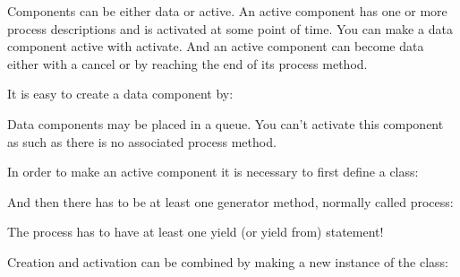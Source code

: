 \documentclass[letterpaper,10pt,english]{sphinxmanual}
\begin{document}
Components can be either data or active. An active component has one or more process descriptions and is activated
at some point of time. You can make a data component active with activate. And an active component can become
data either with a cancel or by reaching the end of its process method.

It is easy to create a data component by:

%
\begin{sphinxVerbatim}[commandchars=\\\{\}]
  
\end{sphinxVerbatim}

Data components may be placed in a queue. You can’t activate this component as such as there is no associated process method.

In order to make an active component it is necessary to first define a class:

%
\begin{sphinxVerbatim}[commandchars=\\\{\}]
 
\end{sphinxVerbatim}

And then there has to be at least one generator method, normally called process:

%
\begin{sphinxVerbatim}[commandchars=\\\{\}]
 
     
         
\end{sphinxVerbatim}

The process has to have at least one yield (or yield from) statement!

Creation and activation can be combined by making a new instance of the class:

%
\begin{sphinxVerbatim}[commandchars=\\\{\}]
  
  
  
\end{sphinxVerbatim}
\end{document}
